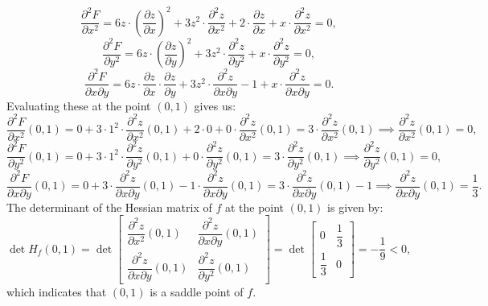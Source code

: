 \documentclass[11pt]{article}
\begin{document}
\[\frac{\partial^2 F}{\partial x^2} = 6z \cdot \left(\frac{\partial z}{\partial x}\right)^2 + 3z^2 \cdot \frac{\partial^2 z}{\partial x^2} + 2 \cdot \frac{\partial z}{\partial x} + x \cdot \frac{\partial^2 z}{\partial x^2} = 0,\]
\[\frac{\partial^2 F}{\partial y^2} = 6z \cdot \left(\frac{\partial z}{\partial y}\right)^2 + 3z^2 \cdot \frac{\partial^2 z}{\partial y^2} + x \cdot \frac{\partial^2 z}{\partial y^2} = 0,\]
\[\frac{\partial^2 F}{\partial x \partial y} = 6z \cdot \frac{\partial z}{\partial x} \cdot \frac{\partial z}{\partial y} + 3z^2 \cdot \frac{\partial^2 z}{\partial x \partial y} - 1 + x \cdot \frac{\partial^2 z}{\partial x \partial y} = 0.\]
\newpage
Evaluating these at the point \((0, 1)\) gives us:
\[\frac{\partial^2 F}{\partial x^2}(0, 1) = 0 + 3 \cdot 1^2 \cdot \frac{\partial^2 z}{\partial x^2}(0, 1) + 2 \cdot 0 + 0 \cdot \frac{\partial^2 z}{\partial x^2}(0, 1) = 3 \cdot \frac{\partial^2 z}{\partial x^2}(0, 1) \implies \frac{\partial^2 z}{\partial x^2}(0, 1) = 0,\]
\[\frac{\partial^2 F}{\partial y^2}(0, 1) = 0 + 3 \cdot 1^2 \cdot \frac{\partial^2 z}{\partial y^2}(0, 1) + 0 \cdot \frac{\partial^2 z}{\partial y^2}(0, 1) = 3 \cdot \frac{\partial^2 z}{\partial y^2}(0, 1) \implies \frac{\partial^2 z}{\partial y^2}(0, 1) = 0,\]
\[\frac{\partial^2 F}{\partial x \partial y}(0, 1) = 0 + 3 \cdot \frac{\partial^2 z}{\partial x \partial y}(0, 1) - 1 \cdot \frac{\partial^2 z}{\partial x \partial y}(0, 1) = 3 \cdot \frac{\partial^2 z}{\partial x \partial y}(0, 1) - 1 \implies \frac{\partial^2 z}{\partial x \partial y}(0, 1) = \frac{1}{3}.\]
The determinant of the Hessian matrix of \(f\) at the point \((0, 1)\) is given by:
\[\det H_f(0, 1) = \det \begin{bmatrix} \dfrac{\partial^2 z}{\partial x^2}(0, 1) & \dfrac{\partial^2 z}{\partial x \partial y}(0, 1) \\ \dfrac{\partial^2 z}{\partial x \partial y}(0, 1) & \dfrac{\partial^2 z}{\partial y^2}(0, 1) \end{bmatrix} = \det \begin{bmatrix} 0 & \dfrac{1}{3} \\ \dfrac{1}{3} & 0 \end{bmatrix} = -\frac{1}{9} < 0,\]
which indicates that \((0, 1)\) is a saddle point of \(f\).
\pagebreak
\end{document}
